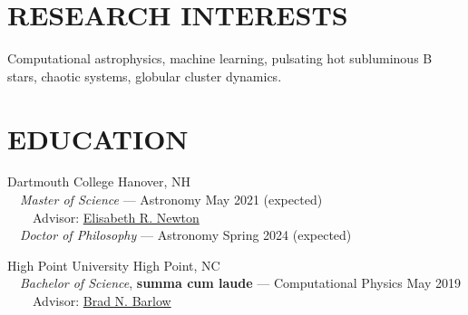 \documentclass[margin, 10pt]{res} %
\begin{document}
\begin{resume}

 
\section{RESEARCH INTERESTS}  
Computational astrophysics, machine learning, pulsating hot subluminous B stars, chaotic systems, globular cluster dynamics.
 

\section{EDUCATION}
{\large Dartmouth College} \hfill Hanover, NH\\
{\-\ \-\ \small \textit{Master of Science} --- Astronomy} \hfill May 2021 (expected)\\
{\-\ \-\ \-\ \-\ \small Advisor: \href{https://physics.dartmouth.edu/people/elisabeth-newton}{Elisabeth R. Newton}} \\
{\-\ \-\ \small \textit{Doctor of Philosophy} –-- Astronomy} \hfill Spring 2024 (expected)

{\large High Point University} \hfill High Point, NC\\
{\-\ \-\ \small \textit{Bachelor of Science}, \textbf{summa cum laude} --- Computational Physics} \hfill May 2019\\
{\-\ \-\ \-\ \-\ \small Advisor: \href{http://linus.highpoint.edu/~bbarlow/}{Brad N. Barlow}} \\


\end{resume}
\end{document}

